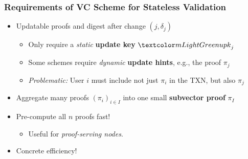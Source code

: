 \begin{frame}
    \frametitle{Requirements of VC Scheme for Stateless Validation}

    \pause
    \begin{itemize}
        \item \alert{Updatable} proofs and digest after change $(j,\delta_j)$\pause
        \begin{itemize}
            \item Only require a \textit{static} \textbf{update key} $\upk_j$\pause
            \item Some schemes require \textit{dynamic} \textbf{update hints}, e.g., the proof $\pi_j$\pause
            \item \textit{Problematic:} User $i$ must include not just $\pi_i$ in the TXN, but also $\pi_j$\pause
        \end{itemize}
        \item \alert{Aggregate} many proofs $(\pi_i)_{i\in I}$ into one small \textbf{subvector proof} $\pi_I$\pause
        \item \alert{Pre-compute} all $n$ proofs fast!\pause
        \begin{itemize}
            \item Useful for \textit{proof-serving nodes}.\pause
        \end{itemize}
        \item \alert{Concrete efficiency!}%
        \end{itemize}
\end{frame}
